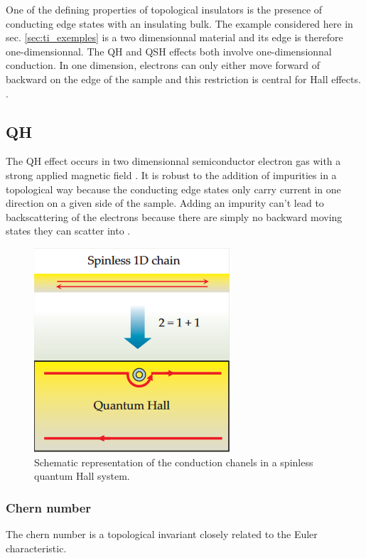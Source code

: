 One of the defining properties of topological insulators is the presence of conducting edge states with an insulating bulk. The example considered here in sec. \ref{sec:ti_exemples} is a two dimensionnal material and its edge is therefore one-dimensionnal. The QH and QSH effects both involve one-dimensionnal conduction. In one dimension, electrons can only either move forward of backward on the edge of the sample and this restriction is central for Hall effects. \cite{qi_quantum_2010}.  
\subsection{QH}
The QH effect occurs in two dimensionnal semiconductor electron gas with a strong applied magnetic field \cite{qi_quantum_2010}. It is robust to the addition of impurities in a topological way because the conducting edge states only carry current in one direction on a given side of the sample. Adding an impurity can't lead to backscattering of the electrons because there are simply no backward moving states they can scatter into \cite{qi_quantum_2010}. 
\begin{figure}[h!]
    \includegraphics[scale = 0.7]{sections/visuel/spinless.png}
    \caption{Schematic representation of the conduction chanels in a spinless quantum Hall system.\cite{qi_quantum_2010}}
    \label{spinless}
\end{figure}



\subsubsection{Chern number}

The chern number is a topological invariant closely related to the Euler characteristic.

